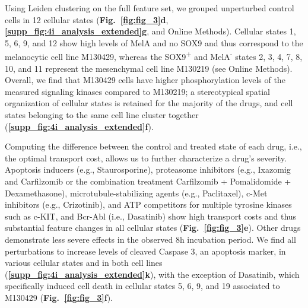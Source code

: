 Using Leiden clustering on the full feature set, we grouped unperturbed control cells in 12 cellular states (\textbf{Fig.~\ref{fig:fig_3}d}, \textbf{\ref{supp_fig:4i_analysis_extended}g}, and Online Methods). Cellular states 1, 5, 6, 9, and 12 show high levels of MelA and no SOX9 and thus correspond to the melanocytic cell line M130429, whereas the SOX9\textsuperscript{+} and MelA\textsuperscript{-} states 2, 3, 4, 7, 8, 10, and 11 represent the mesenchymal cell line M130219 (see Online Methods). Overall, we find that M130429 cells have higher phosphorylation levels of the measured signaling kinases compared to M130219;
a stereotypical spatial organization of cellular states is retained for the majority of the drugs,  and cell states belonging to the same cell line cluster together (\textbf{\ref{supp_fig:4i_analysis_extended}f}). 

Computing the difference between the control and treated state of each drug, i.e., the optimal
transport cost, allows us to further characterize a drug's severity. 
Apoptosis inducers (e.g., Staurosporine), proteasome inhibitors (e.g., Ixazomig and Carfilzomib or the combination treatment Carfilzomib + Pomalidomide + Dexamethasone), microtubule-stabilizing agents (e.g., Paclitaxel), c-Met inhibitors (e.g., Crizotinib), and ATP competitors for multiple tyrosine kinases such as c-KIT, and Bcr-Abl (i.e., Dasatinib) show high transport costs and thus substantial feature changes in all cellular states (\textbf{Fig.~\ref{fig:fig_3}e}). Other drugs demonstrate less severe effects in the observed 8h incubation period. 
We find all perturbations to increase levels of cleaved Caspase 3, an apoptosis marker, in various cellular states and in both cell lines (\textbf{\ref{supp_fig:4i_analysis_extended}k}), with the exception of Dasatinib, which specifically induced cell death in cellular states 5, 6, 9, and 19 associated to M130429 (\textbf{Fig.~\ref{fig:fig_3}f}).


